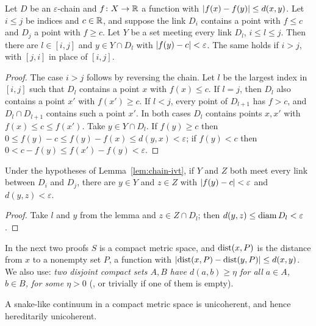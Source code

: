 \begin{lemma}\label{lem:chain-ivt}
Let $D$ be an $\varepsilon$-chain and $f\colon X\to\mathbb{R}$ a function with $\left\lvert f(x)-f(y)\right\rvert\le d(x,y)$.
Let $i\le j$ be indices and $c\in\mathbb{R}$, and suppose the link $D_i$ contains a point with $f\le c$ and
$D_j$ a point with $f\ge c$. Let $Y$ be a set meeting every link $D_l$, $i\le l\le j$. Then there are
$l\in[i,j]$ and $y\in Y\cap D_l$ with $\left\lvert f(y)-c\right\rvert<\varepsilon$. The same holds if $i>j$, with $[j,i]$
in place of $[i,j]$.
\end{lemma}

\begin{proof}
The case $i>j$ follows by reversing the chain. Let $l$ be the largest index in $[i,j]$ such that $D_l$
contains a point $x$ with $f(x)\le c$. If $l=j$, then $D_l$ also contains a point $x'$ with $f(x')\ge c$.
If $l<j$, every point of $D_{l+1}$ has $f>c$, and $D_l\cap D_{l+1}$ contains such a point $x'$. In both
cases $D_l$ contains points $x,x'$ with $f(x)\le c\le f(x')$. Take $y\in Y\cap D_l$. If $f(y)\ge c$ then
$0\le f(y)-c\le f(y)-f(x)\le d(y,x)<\varepsilon$; if $f(y)<c$ then $0<c-f(y)\le f(x')-f(y)<\varepsilon$.
\end{proof}


\begin{corollary}\label{cor:two-sets}
Under the hypotheses of Lemma~\ref{lem:chain-ivt}, if $Y$ and $Z$ both meet every link between $D_i$
and $D_j$, there are $y\in Y$ and $z\in Z$ with $\left\lvert f(y)-c\right\rvert<\varepsilon$ and $d(y,z)<\varepsilon$.
\end{corollary}

\begin{proof}
Take $l$ and $y$ from the lemma and $z\in Z\cap D_l$; then $d(y,z)\le\operatorname{diam} D_l<\varepsilon$.
\end{proof}


In the next two proofs $S$ is a compact metric space, and $\operatorname{dist}(x,P)$ is the distance from $x$ to a
nonempty set $P$, a function with $\left\lvert \operatorname{dist}(x,P)-\operatorname{dist}(y,P)\right\rvert\le d(x,y)$. We also use: \emph{two
disjoint compact sets $A,B$ have $d(a,b)\ge\eta$ for all $a\in A$, $b\in B$, for some $\eta>0$}
(, or trivially if one of them is empty).

\begin{theorem}\label{thm:snake-unicoherent}
A snake-like continuum in a compact metric space is unicoherent, and hence hereditarily
unicoherent.
\end{theorem}

